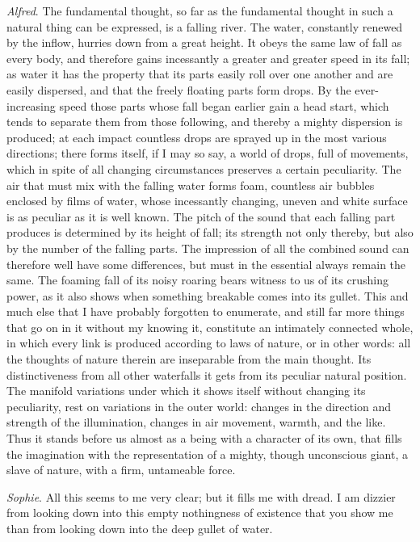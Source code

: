 \documentclass[12pt,a4paper,openany]{book}
\newcommand{\opage}[1]{\marginnote{\footnotesize\textit{[#1]}}}
\begin{document}
\emph{Alfred}. The fundamental thought, so far as the fundamental thought in such a
natural thing can be expressed, is a falling river. The water, constantly renewed by
the inflow, hurries down from
\setcounter{footnote}{0}%
\opage{61}a great height. It obeys the same law of fall as every body, and therefore
gains incessantly a greater and greater speed in its fall; as water it has the
property that its parts easily roll over one another and are easily dispersed, and
that the freely floating parts form drops. By the ever-increasing speed those parts
whose fall began earlier gain a head start, which tends to separate them from those
following, and thereby a mighty dispersion is produced; at each impact countless
drops are sprayed up in the most various directions; there forms itself, if I may
so say, a world of drops, full of movements, which in spite of all changing
circumstances preserves a certain peculiarity. The air that must mix with the
falling water forms foam, countless air bubbles enclosed by films of water, whose
incessantly changing, uneven and white surface is as peculiar as it is well known.
The pitch of the sound that each falling part produces is determined by its height
of fall; its strength not only thereby, but also by the number of the falling parts.
The impression of all the combined sound can therefore well have some differences,
but must in the essential always remain the same. The foaming fall of its noisy
roaring bears witness to us of its crushing power, as it also shows when something
breakable comes into its gullet. This and much else that I have probably forgotten
to enumerate, and still far more things that go on in it without my knowing it,
constitute an intimately connected whole, in which every link is produced according
to laws of nature, or in other words: all the thoughts of nature therein are
inseparable from the main thought. Its distinctiveness from all other waterfalls it
gets from its peculiar natural position. The manifold variations under which it
shows itself without changing its peculiarity, rest on variations in the outer
world: changes in the direction and strength of the illumination, changes in air
movement, warmth, and the like. Thus it stands before us almost as a being with a
character of its own, that fills the imagination with the representation of a
mighty, though
\setcounter{footnote}{0}%
\opage{62}unconscious giant, a slave of nature, with a firm, untameable force.

\emph{Sophie}. All this seems to me very clear; but it fills me with dread. I am
dizzier from looking down into this empty nothingness of existence that you show
me than from looking down into the deep gullet of water.
\end{document}

